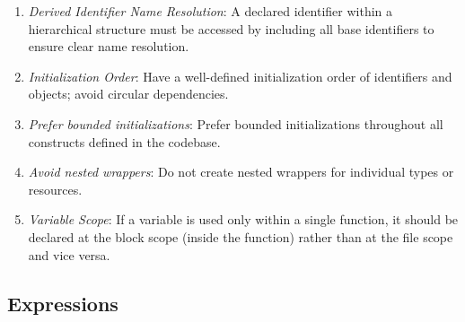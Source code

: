 \documentclass[9pt]{IEEEtran} %
\begin{document}
\begin{enumerate}
  \item \textit{Derived Identifier Name Resolution}: A declared identifier within a hierarchical structure must be accessed by including all base identifiers to ensure clear name resolution.
  \item \textit{Initialization Order}: Have a well-defined initialization order of identifiers and objects; avoid circular dependencies.
  \item \textit{Prefer bounded initializations}: Prefer bounded initializations throughout all constructs defined in the codebase.
  \item \textit{Avoid nested wrappers}: Do not create nested wrappers for individual types or resources.
  \item \textit{Variable Scope}: If a variable is used only within a single function, it should be declared at the block scope (inside the function) rather than at the file scope and vice versa.
\end{enumerate}

\subsection{Expressions}
\label{ESSExpression}
\end{document}
